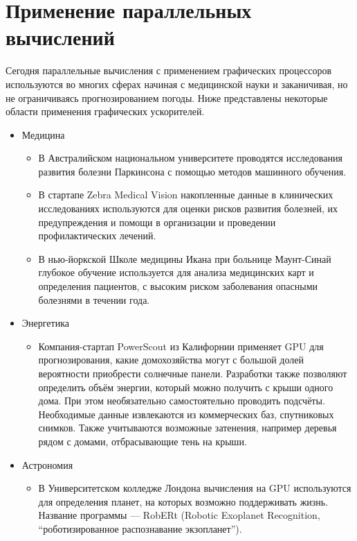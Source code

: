 \section{Применение параллельных вычислений}

Сегодня параллельные вычисления с применением графических процессоров используются во многих сферах начиная с медицинской науки и заканичивая, но не ограничиваясь прогнозированием погоды. Ниже представлены некоторые области применения графических ускорителей.

\begin{itemize}
\item{Медицина}
  \begin{itemize}
  \item{В Австралийском национальном университете проводятся исследования развития болезни Паркинсона с помощью методов машинного обучения\cite{almanac1}.}
  \item{В стартапе Zebra Medical Vision накопленные данные в клинических исследованиях используются для оценки рисков развития болезней, их предупреждения и помощи в организации и проведении профилактических лечений\cite{almanac1}.}
  \item{В нью-йоркской Школе медицины Икана при больнице Маунт-Синай глубокое обучение используется для анализа медицинских карт и определения пациентов, с высоким риском заболевания опасными болезнями в течении года\cite{almanac2}.}
 \end{itemize}

\item{Энергетика}

\begin{itemize}
  \item{Компания-стартап PowerScout из Калифорнии применяет GPU для прогнозирования, какие домохозяйства могут с большой долей вероятности приобрести солнечные панели. Разработки  также позволяют определить объём энергии, который можно получить с крыши одного дома. При этом необязательно самостоятельно проводить подсчёты. Необходимые данные извлекаются из коммерческих баз, спутниковых снимков. Также учитываются возможные затенения, например деревья рядом с домами, отбрасывающие тень на крыши\cite{almanac1}.}  
\end{itemize}

\item{Астрономия}

\begin{itemize}
  \item{В Университетском колледже Лондона вычисления на GPU используются для определения планет, на которых возможно поддерживать жизнь. Название программы --- RobERt (Ro\-bo\-tic Exo\-pla\-net Re\-co\-gni\-tion, ``роботизированное распознавание эк\-зо\-пла\-нет'')\cite{almanac2}.}
\end{itemize}


\end{itemize}
